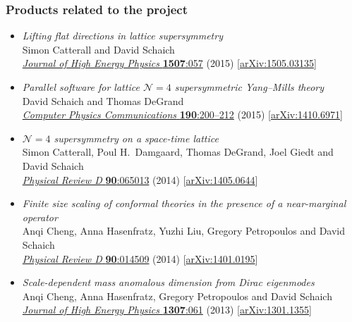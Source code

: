 \documentclass[12 pt]{article}
\begin{document}
\subsubsection*{Products related to the project} %
\begin{itemize}
  \item {\em Lifting flat directions in lattice supersymmetry} \\
        Simon Catterall and David Schaich \\
        \href{http://dx.doi.org/10.1007/JHEP07(2015)057}{{\em Journal of High Energy Physics} {\bf 1507}:057} (2015) [\href{http://arxiv.org/abs/1505.03135}{arXiv:1505.03135}]
  \item {\em Parallel software for lattice $\mathcal N = 4$ supersymmetric Yang--Mills theory} \\
        David Schaich and Thomas DeGrand \\
        \href{http://dx.doi.org/10.1016/j.cpc.2014.12.025}{{\em Computer Physics Communications} {\bf 190}:200--212} (2015) [\href{http://arxiv.org/abs/1410.6971}{arXiv:1410.6971}]
  \item {\em $\mathcal N = 4$ supersymmetry on a space-time lattice} \\
        Simon Catterall, Poul H.~Damgaard, Thomas DeGrand, Joel Giedt and David Schaich \\
        \href{http://dx.doi.org/10.1103/PhysRevD.90.065013}{{\em Physical Review D} {\bf 90}:065013} (2014) [\href{http://arxiv.org/abs/1405.0644}{arXiv:1405.0644}]
  \item {\em Finite size scaling of conformal theories in the presence of a near-marginal operator} \\
        Anqi Cheng, Anna Hasenfratz, Yuzhi Liu, Gregory Petropoulos and David Schaich \\
        \href{http://dx.doi.org/10.1103/PhysRevD.90.014509}{{\em Physical Review D} {\bf 90}:014509} (2014) [\href{http://arxiv.org/abs/1401.0195}{arXiv:1401.0195}]
  \item {\em Scale-dependent mass anomalous dimension from Dirac eigenmodes} \\
        Anqi Cheng, Anna Hasenfratz, Gregory Petropoulos and David Schaich \\
        \href{http://dx.doi.org/10.1007/JHEP07(2013)061}{{\em Journal of High Energy Physics} {\bf 1307}:061} (2013) [\href{http://arxiv.org/abs/1301.1355}{arXiv:1301.1355}]
\end{itemize}
\end{document}
